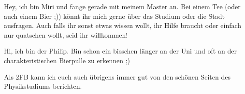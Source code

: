 \begin{multicols*}{2}
{Hey, ich bin Miri und fange gerade mit meinem Master an. Bei einem Tee (oder auch einem Bier ;)) könnt ihr mich gerne über das Studium oder die Stadt ausfragen. Auch falls ihr sonst etwas wissen wollt, ihr Hilfe braucht oder einfach nur quatschen wollt, seid ihr willkommen!

\vspace{1ex}}

{Hi, ich bin der Philip. Bin schon ein bisschen länger an der Uni und oft an der charakteristischen Bierpulle zu erkennen ;)

Als 2FB kann ich euch auch übrigens immer gut von den schönen Seiten des Physikstudiums berichten.
\vspace{\baselineskip}}


\end{multicols*}

